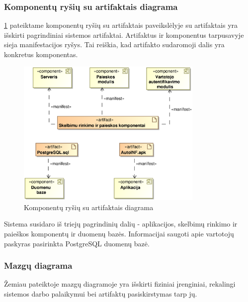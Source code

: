 \documentclass[12pt]{article}
\begin{document}
	\subsubsection{Komponentų ryšių su artifaktais diagrama}
	
	\ref{ArtComp} pateiktame komponentų ryšių su artifaktais paveikslėlyje su artifaktais yra išskirti pagrindiniai sistemos artifaktai. Artifaktus ir komponentus tarpusavyje sieja manifestacijos ryšys. Tai reiškia, kad artifakto sudaromoji dalis yra konkretus komponentas.
	
	\begin{figure}[h]
		\begin{center}
			\includegraphics[width=0.8\textwidth]{ArtifaktaiKomponentai.eps}
			\caption{Komponentų ryšių su artifaktais diagrama\label{ArtComp}}
		\end{center}
	\end{figure}

	Sistema susidaro iš triejų pagrindinių dalių - aplikacijos, skelbimų rinkimo ir paieškos komponentų ir duomenų bazės. Informacijai saugoti apie vartotojų paskyras pasirinkta PostgreSQL duomenų bazė.
	\pagebreak
	
	\subsubsection{Mazgų diagrama}
	
	Žemiau pateiktoje mazgų diagramoje yra išskirti fiziniai įrenginiai, rekalingi sistemos darbo palaikymui bei artifaktų pasiskirstymas tarp jų.\\
	
\end{document}

